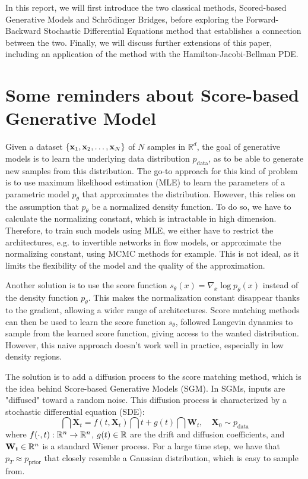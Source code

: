 \documentclass{article}
\begin{document}
In this report, we will first introduce the two classical methods, Scored-based Generative Models and Schrödinger Bridges, before exploring the Forward-Backward Stochastic Differential Equations method that establishes a connection between the two.
Finally, we will discuss further extensions of this paper, including an application of the method with the Hamilton-Jacobi-Bellman PDE.



\section{Some reminders about Score-based Generative Model}

Given a dataset $\left\lbrace \mathbf{x}_1, \mathbf{x}_2, \dots, \mathbf{x}_N \right\rbrace$ of $N$ samples in $\mathbb{R}^d$, the goal of generative models is to learn the underlying data distribution $p_\mathrm{data}$, as to be able to generate new samples from this distribution.
The go-to approach for this kind of problem is to use maximum likelihood estimation (MLE) to learn the parameters of a parametric model $p_\theta$ that approximates the distribution. However, this relies on the assumption that $p_\theta$ be a normalized density function. To do so, we have to calculate the normalizing constant, which is intractable in high dimension. Therefore, to train such models using MLE, we either have to restrict the architectures, e.g. to invertible networks in flow models, or approximate the normalizing constant, using MCMC methods for example. This is not ideal, as it limits the flexibility of the model and the quality of the approximation.

Another solution is to use the score function $s_\theta(x) = \nabla_x \log p_\theta(x)$ instead of the density function $p_\theta$.
This makes the normalization constant disappear thanks to the gradient, allowing a wider range of architectures.
Score matching methods can then be used to learn the score function $s_\theta$, followed Langevin dynamics to sample from the learned score function, giving access to the wanted distribution.
However, this naive approach doesn't work well in practice, especially in low density regions.

The solution is to add a diffusion process to the score matching method, which is the idea behind Score-based Generative Models (SGM).
In SGMs, inputs are "diffused" toward a random noise.
This diffusion process is characterized by a stochastic differential equation (SDE):
\begin{equation}
    \dint{\mathbf{X}_t} = f(t,\mathbf{X}_t)\dint{t} + g(t) \dint{\mathbf{W}_t}, \quad \mathbf{X}_0 \sim p_\mathrm{data}
    \label{eq:forward_sde_sgm}
\end{equation}
where $f(\cdot, t) : \mathbb{R}^n \rightarrow \mathbb{R}^n$, $g(t) \in \mathbb{R}$ are the drift and diffusion coefficients, and $\mathbf{W}_t \in \mathbb{R}^n$ is a standard Wiener process.
For a large time step, we have that $p_T \approx p_\mathrm{prior}$ that closely resemble a Gaussian distribution, which is easy to sample from.
\end{document}
